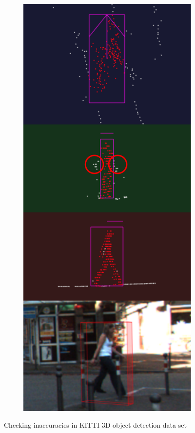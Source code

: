 \documentclass[letterpaper, 10 pt, conference]{ieeeconf}  %
\begin{document}
\begin{figure}
	~
	\begin{subfigure}{0.3\linewidth}
		\includegraphics[scale=0.2]{./figures/annocheck-2}
	\end{subfigure}
	
	\caption{Checking inaccuracies in KITTI 3D object detection data set}
	\label{fig:annocheck}
\end{figure}
\end{document}
